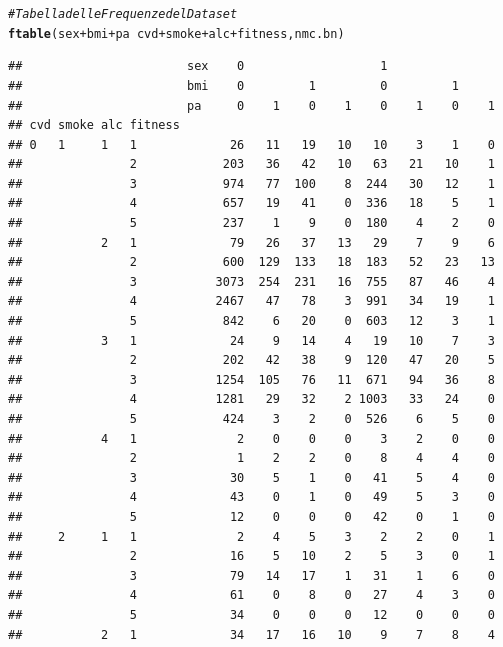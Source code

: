 \documentclass{article}\usepackage[]{graphicx}\usepackage[]{xcolor}
\makeatletter
\newcommand{\hlcom}[1]{\textcolor[rgb]{0.678,0.584,0.686}{\textit{#1}}}%
\newcommand{\hlopt}[1]{\textcolor[rgb]{0,0,0}{#1}}%
\newcommand{\hlstd}[1]{\textcolor[rgb]{0.345,0.345,0.345}{#1}}%
\newcommand{\hlkwd}[1]{\textcolor[rgb]{0.737,0.353,0.396}{\textbf{#1}}}%
\newenvironment{kframe}{%
 \def\at@end@of@kframe{}%
 \ifinner\ifhmode%
  \def\at@end@of@kframe{\end{minipage}}%
  \begin{minipage}{\columnwidth}%
 \fi\fi%
 \def\FrameCommand##1{\hskip\@totalleftmargin \hskip-\fboxsep
 \colorbox{shadecolor}{##1}\hskip-\fboxsep
     \hskip-\linewidth \hskip-\@totalleftmargin \hskip\columnwidth}%
 \MakeFramed {\advance\hsize-\width
   \@totalleftmargin\z@ \linewidth\hsize
   \@setminipage}}%
 {\par\unskip\endMakeFramed%
 \at@end@of@kframe}
\newenvironment{knitrout}{}{} %
\makeatother
\begin{document}
    
\begin{knitrout}
\color{fgcolor}\begin{kframe}
\begin{alltt}
\hlcom{#Tabella delle Frequenze del Dataset}
\hlkwd{ftable}\hlstd{(sex}\hlopt{+}\hlstd{bmi}\hlopt{+}\hlstd{pa} \hlopt{~} \hlstd{cvd}\hlopt{+}\hlstd{smoke}\hlopt{+}\hlstd{alc}\hlopt{+}\hlstd{fitness, nmc.bn)}
\end{alltt}
\begin{verbatim}
##                       sex    0                   1               
##                       bmi    0         1         0         1     
##                       pa     0    1    0    1    0    1    0    1
## cvd smoke alc fitness                                            
## 0   1     1   1             26   11   19   10   10    3    1    0
##               2            203   36   42   10   63   21   10    1
##               3            974   77  100    8  244   30   12    1
##               4            657   19   41    0  336   18    5    1
##               5            237    1    9    0  180    4    2    0
##           2   1             79   26   37   13   29    7    9    6
##               2            600  129  133   18  183   52   23   13
##               3           3073  254  231   16  755   87   46    4
##               4           2467   47   78    3  991   34   19    1
##               5            842    6   20    0  603   12    3    1
##           3   1             24    9   14    4   19   10    7    3
##               2            202   42   38    9  120   47   20    5
##               3           1254  105   76   11  671   94   36    8
##               4           1281   29   32    2 1003   33   24    0
##               5            424    3    2    0  526    6    5    0
##           4   1              2    0    0    0    3    2    0    0
##               2              1    2    2    0    8    4    4    0
##               3             30    5    1    0   41    5    4    0
##               4             43    0    1    0   49    5    3    0
##               5             12    0    0    0   42    0    1    0
##     2     1   1              2    4    5    3    2    2    0    1
##               2             16    5   10    2    5    3    0    1
##               3             79   14   17    1   31    1    6    0
##               4             61    0    8    0   27    4    3    0
##               5             34    0    0    0   12    0    0    0
##           2   1             34   17   16   10    9    7    8    4

\end{verbatim}
\end{kframe}
\end{knitrout}
\end{document}
